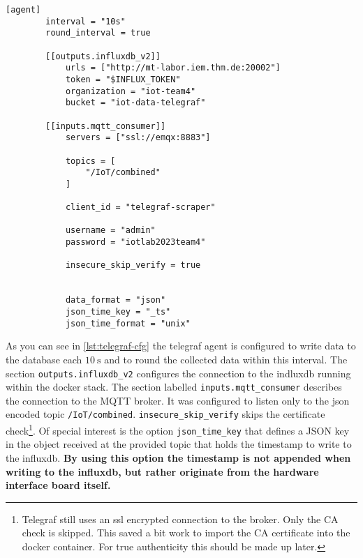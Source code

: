 		\begin{lstlisting}[tabsize=2, gobble=4, caption={Telegraf configuration}, label=lst:telegraf-cfg]
		[agent]
		interval = "10s"
		round_interval = true		

		[[outputs.influxdb_v2]]
			urls = ["http://mt-labor.iem.thm.de:20002"]
			token = "$INFLUX_TOKEN"
			organization = "iot-team4"
			bucket = "iot-data-telegraf"
		
		[[inputs.mqtt_consumer]]
			servers = ["ssl://emqx:8883"]
		
			topics = [
				"/IoT/combined"
			]
		
			client_id = "telegraf-scraper"
		
			username = "admin"
			password = "iotlab2023team4"
		
			insecure_skip_verify = true
		

			data_format = "json"
			json_time_key = "_ts"
			json_time_format = "unix"		
		\end{lstlisting}
		
		As you can see in \cref{lst:telegraf-cfg} the telegraf agent is configured to write data to the database each $ 10~\si{\second} $ and to round the collected data within this interval. The section \texttt{outputs.influxdb\_v2} configures the connection to the indluxdb running within the docker stack. The section labelled \texttt{inputs.mqtt\_consumer} describes the connection to the \ac{MQTT} broker. It was configured to listen only to the json encoded topic \texttt{/IoT/combined}. \texttt{insecure\_skip\_verify} skips the certificate check\footnote{Telegraf still uses an ssl encrypted connection to the broker. Only the CA check is skipped. This saved a bit work to import the CA certificate into the docker container. For true authenticity this should be made up later.}. Of special interest is the option \texttt{json\_time\_key} that defines a \ac{JSON} key in the object received at the provided topic that holds the timestamp to write to the influxdb. \textbf{By using this option the timestamp is not appended when writing to the influxdb, but rather originate from the hardware interface board itself.}